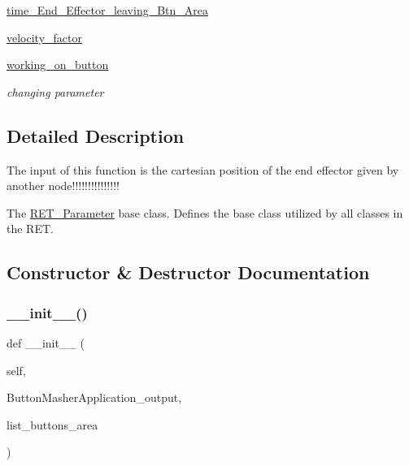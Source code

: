 \begin{DoxyCompactItemize}
\item 
\hyperlink{classRET__Parameter_1_1RET__Parameter_ab4ac422d38097f009ddb2c18a4172740}{time\+\_\+\+End\+\_\+\+Effector\+\_\+leaving\+\_\+\+Btn\+\_\+\+Area}
\item 
\hyperlink{classRET__Parameter_1_1RET__Parameter_a082e6ba9804a6094336b4c267262460e}{velocity\+\_\+factor}
\item 
\hyperlink{classRET__Parameter_1_1RET__Parameter_a96204c1a4417d5a3a980521f8a66a1fa}{working\+\_\+on\+\_\+button}
\begin{DoxyCompactList}\small\item\em changing parameter \end{DoxyCompactList}\end{DoxyCompactItemize}


\subsection{Detailed Description}
The input of this function is the cartesian position of the end effector given by another node!!!!!!!!!!!!!!! 

The \hyperlink{classRET__Parameter_1_1RET__Parameter}{R\+E\+T\+\_\+\+Parameter} base class. Defines the base class utilized by all classes in the R\+ET. 

\subsection{Constructor \& Destructor Documentation}
\mbox{\label{classRET__Parameter_1_1RET__Parameter_acaff5a3a7b875ffce45f9c16a3f191d6}} 
\subsubsection{\texorpdfstring{\+\_\+\+\_\+init\+\_\+\+\_\+()}{\_\_init\_\_()}}
{\footnotesize\ttfamily def \+\_\+\+\_\+init\+\_\+\+\_\+ (\begin{DoxyParamCaption}\item[{}]{self,  }\item[{}]{Button\+Masher\+Application\+\_\+output,  }\item[{}]{list\+\_\+buttons\+\_\+area }\end{DoxyParamCaption})}




